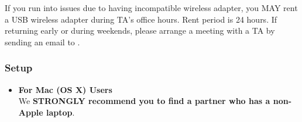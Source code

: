 \medskip

If you run into issues due to having incompatible wireless adapter, you MAY rent a USB wireless adapter during TA's office hours.
Rent period is 24 hours.
If returning early or during weekends, please arrange a meeting with a TA by sending an email to \staffemail.

\hypertarget{cp2setup}{\subsubsection*{Setup}}
\begin{itemize}
  \item \textbf{For Mac (OS X) Users}\\
  We \textbf{STRONGLY recommend you to find a partner who has a non-Apple laptop}.


\end{itemize}
